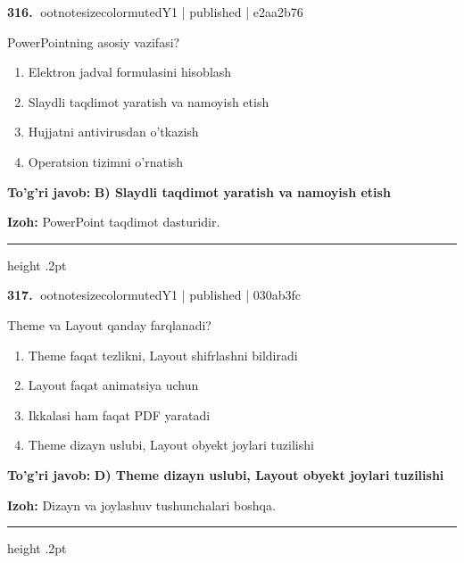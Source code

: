 \documentclass[10pt,a4paper]{article}
\begin{document}
\textbf{\color{ink}316.} {ootnotesizecolor{muted}Y1 | published | e2aa2b76}
\par
PowerPointning asosiy vazifasi?
\begin{enumerate}[label=\Alph*),leftmargin=9mm]
\item Elektron jadval formulasini hisoblash
\item Slaydli taqdimot yaratish va namoyish etish
\item Hujjatni antivirusdan o'tkazish
\item Operatsion tizimni o'rnatish
\end{enumerate}
\begin{tcolorbox}[enhanced,breakable,colback=teal!4,colframe=teal!55!black,boxrule=0.45pt,arc=1.2mm,left=2.8mm,right=2.8mm,top=2mm,bottom=2mm]
\textbf{\color{teal}To'g'ri javob:} \textbf{B) Slaydli taqdimot yaratish va namoyish etish}
\par\smallskip
\textbf{Izoh:} PowerPoint taqdimot dasturidir.
\end{tcolorbox}
\vspace{2mm}\hrule height .2pt\vspace{2mm}

\textbf{\color{ink}317.} {ootnotesizecolor{muted}Y1 | published | 030ab3fc}
\par
Theme va Layout qanday farqlanadi?
\begin{enumerate}[label=\Alph*),leftmargin=9mm]
\item Theme faqat tezlikni, Layout shifrlashni bildiradi
\item Layout faqat animatsiya uchun
\item Ikkalasi ham faqat PDF yaratadi
\item Theme dizayn uslubi, Layout obyekt joylari tuzilishi
\end{enumerate}
\begin{tcolorbox}[enhanced,breakable,colback=teal!4,colframe=teal!55!black,boxrule=0.45pt,arc=1.2mm,left=2.8mm,right=2.8mm,top=2mm,bottom=2mm]
\textbf{\color{teal}To'g'ri javob:} \textbf{D) Theme dizayn uslubi, Layout obyekt joylari tuzilishi}
\par\smallskip
\textbf{Izoh:} Dizayn va joylashuv tushunchalari boshqa.
\end{tcolorbox}
\vspace{2mm}\hrule height .2pt\vspace{2mm}
\end{document}
